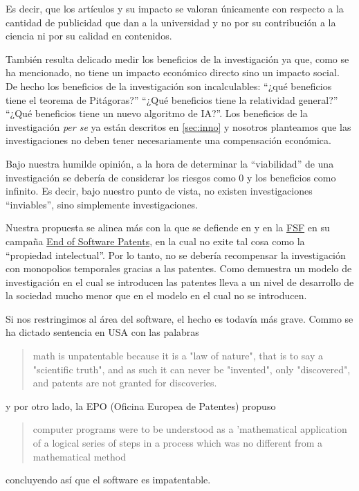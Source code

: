 \documentclass[12pt]{report}
\begin{document}
Es decir, que los artículos y su impacto se valoran únicamente con respecto a la
cantidad de publicidad que dan a la universidad y no por su contribución a la
ciencia ni por su calidad en contenidos.

También resulta delicado medir los beneficios de la investigación ya que, como
se ha mencionado, no tiene un impacto económico directo sino un impacto social.
De hecho los beneficios de la investigación son incalculables: ``¿qué beneficios
tiene el teorema de Pitágoras?'' ``¿Qué beneficios tiene la relatividad
general?'' ``¿Qué beneficios tiene un nuevo algoritmo de IA?''. Los beneficios
de la investigación \textit{per se} ya están descritos en \ref{sec:inno} y
nosotros planteamos que las investigaciones no deben tener necesariamente una compensación
económica.

Bajo nuestra humilde opinión, a la hora de determinar la ``viabilidad''
de una investigación se debería de considerar los riesgos como 0 y los
beneficios como infinito. Es decir, bajo nuestro punto de vista, no existen
investigaciones ``inviables'', sino simplemente investigaciones.

Nuestra propuesta se alinea más con la que se defiende en \cite{stallman} y en
la \href{https://www.fsf.org/}{FSF} en su campaña
\href{http://endsoftpatents.org/}{End of Software Patents}, en la cual no exite tal cosa como la
``propiedad intelectual''. Por lo tanto, no se debería recompensar la
investigación con monopolios temporales gracias a las patentes. Como demuestra
\cite{patents} un modelo de investigación en el cual se introducen las patentes
lleva a un nivel de desarrollo de la sociedad mucho menor que en el modelo en el
cual no se introducen.

Si nos restringimos al área del software, el hecho es todavía más grave. Commo
se ha dictado sentencia en USA con las palabras
\begin{quote}
    math is unpatentable because it is a "law of nature", that is to say
    a "scientific truth", and as such it can never be "invented", only
    "discovered", and patents are not granted for discoveries.
\end{quote}
y por otro lado, la EPO (Oficina Europea de Patentes) propuso
\begin{quote}
    computer programs were to be understood as a 'mathematical
    application of a logical series of steps in a process which was no different
    from a mathematical method
\end{quote}
concluyendo así que el software es impatentable.
\end{document}
